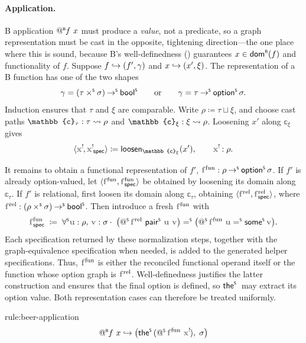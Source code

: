 \paragraph{Application.}
B application \(\mathord{@^{\scriptscriptstyle{\mathsf{B}}}\mkern-1mu} f\ x\) must produce a \emph{value}, not a predicate, so a graph representation must be cast in the opposite, tightening direction---the one place where this is sound, because B's well-definedness () guarantees \(x \in \domB(f)\) and functionality of \(f\).
Suppose \(f \mathrel{\hookrightarrow} (f', \gamma)\) and \(x \mathrel{\hookrightarrow} (x', \xi)\).
The representation of a B function has one of the two shapes
\[
  \gamma=(\tau\mathbin{\times^{\scriptscriptstyle{\mathsf{S}}}}\sigma)\mathbin{\to^{\scriptscriptstyle{\mathsf{S}}}}\mathsf{bool}^{\scriptscriptstyle{\mathsf{S}}}
  \qquad\text{or}\qquad
  \gamma=\tau\mathbin{\to^{\scriptscriptstyle{\mathsf{S}}}}\mathord{\mathsf{option}^{\scriptscriptstyle{\mathsf{S}}}}\,\sigma.
\]
Induction ensures that \(\tau\) and \(\xi\) are comparable.
Write \(\rho\coloneq\tau\sqcup\xi\), and choose cast paths
\(\mathbb{c}_\tau:\castpath{\tau}{\rho}\) and
\(\mathbb{c}_\xi:\castpath{\xi}{\rho}\).
Loosening \(x'\) along \(\mathbb{c}_\xi\) gives
\[
  \langle\lvar{x},\spec{\lvar{x}}\rangle
  \coloneq
  \mathsf{loosen}_{\mathbb{c}_\xi}(x'),
  \qquad
  \lvar{x}:\rho.
\]

It remains to obtain a functional representation of \(f'\), \ie
\(\var{f}^{\mathrm{fun}}:\rho\toS\optS\sigma\).
If \(f'\) is already option-valued, let
\(\langle\var{f}^{\mathrm{fun}},\spec{\var{f}^{\mathrm{fun}}}\rangle\)
be obtained by loosening its domain along \(\mathbb{c}_\tau\).
If \(f'\) is relational, first loosen its domain along \(\mathbb{c}_\tau\), obtaining
\(\langle\var{f}^{\mathrm{rel}},\spec{\var{f}^{\mathrm{rel}}}\rangle\), where
\(\var{f}^{\mathrm{rel}}:(\rho\timesS\sigma)\toS\boolS\).
Then introduce a fresh \(\var{f}^{\mathrm{fun}}\) with
\[
  \spec{\var{f}^{\mathrm{fun}}}
  \;\coloneq\;
  \forallS \var{u}:\rho,\,\var{v}:\sigma\cdot\;
  \bigl(\appS{\var{f}^{\mathrm{rel}}}{\pairS{\var{u}}{\var{v}}}\bigr)
  \eqS
  \bigl(\appS{\var{f}^{\mathrm{fun}}}{\var{u}}\eqS\someS\var{v}\bigr).
\]
Each specification returned by these normalization steps, together with the graph-equivalence specification when needed, is added to the generated helper specifications.
Thus, \(\var{f}^{\mathrm{fun}}\) is either the reconciled functional operand itself or the function whose option graph is \(\var{f}^{\mathrm{rel}}\).
Well-definedness justifies the latter construction and ensures that the final option is defined, so \(\mathord{\mathsf{the}^{\scriptscriptstyle{\mathsf{S}}}}\,\) may extract its option value.
Both representation cases can therefore be treated uniformly.
\begin{encrule}[application]{rule:beer-application}
\[
  \appB f\ x
  \encto
  \bigl(\theS(\appS{\var{f}^{\mathrm{fun}}}{\lvar{x}}),\;\sigma\bigr)
\]
\end{encrule}

